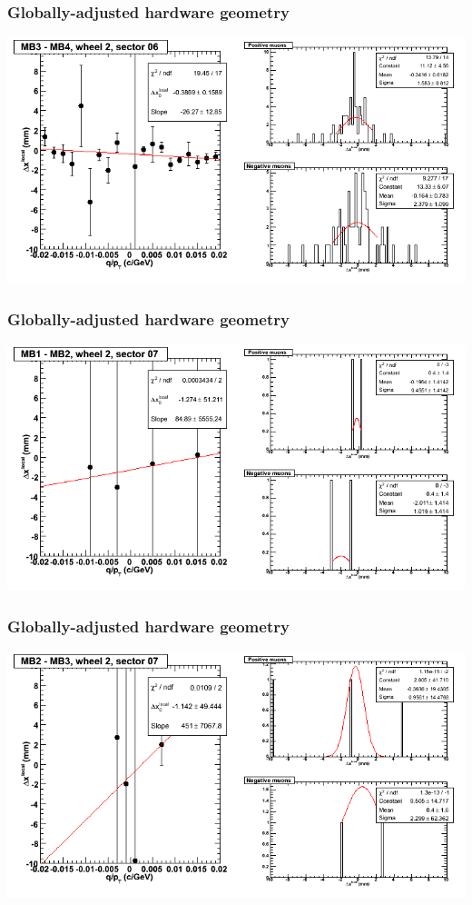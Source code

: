\documentclass[compress]{beamer}
\begin{document}
\begin{frame}
\frametitle{Globally-adjusted hardware geometry}
\includegraphics[width=\linewidth]{NOV4_segdiffs_HW/dt13_resid_E_06_34.png}
\end{frame}

\begin{frame}
\frametitle{Globally-adjusted hardware geometry}
\includegraphics[width=\linewidth]{NOV4_segdiffs_HW/dt13_resid_E_07_12.png}
\end{frame}

\begin{frame}
\frametitle{Globally-adjusted hardware geometry}
\includegraphics[width=\linewidth]{NOV4_segdiffs_HW/dt13_resid_E_07_23.png}
\end{frame}
\end{document}
